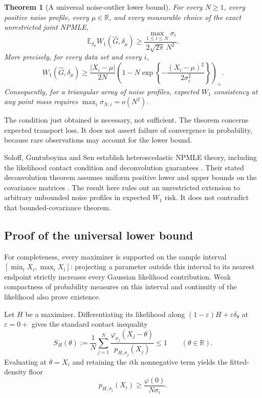 \documentclass[11pt,a4paper]{article}
\newtheorem{theorem}{Theorem}[section]
\theoremstyle{definition}
\theoremstyle{remark}
\numberwithin{equation}{section}
\begin{document}
\begin{theorem}[A universal noise-outlier lower bound]\label{p7:ho:main}
For every $N\ge1$, every positive noise profile, every $\mu\in\mathbb R$,
and every measurable choice of the exact unrestricted joint NPMLE,
\begin{equation}\label{p7:ho:risk}
 \mathbb E_{\delta_\mu} W_1(\widehat G,\delta_\mu)
       \ge \frac{\max_{1\le i\le N}\sigma_i}
                       {2\sqrt{2\pi}\,N^2}.
\end{equation}
More precisely, for every data set and every $i$,
\begin{equation}\label{p7:ho:deterministic}
 W_1(\widehat G,\delta_\mu)
 \ge \frac{|X_i-\mu|}{2N}
       \left(1-N\exp\left\{-\frac{(X_i-\mu)^2}{2\sigma_i^2}\right\}
       \right)_+.
\end{equation}
Consequently, for a triangular array of noise profiles, expected
$W_1$ consistency at any point mass requires
$\max_i\sigma_{N,i}=o(N^2)$.
\end{theorem}

The condition just obtained is necessary, not sufficient.  The theorem
concerns expected transport loss.  It does not assert failure of
convergence in probability, because rare observations may account for
the lower bound.

Soloff, Guntuboyina and Sen establish heteroscedastic NPMLE theory,
including the likelihood contact condition and deconvolution guarantees
\cite{p7:HO_SGS}.  Their stated deconvolution theorem assumes uniform
positive lower and upper bounds on the covariance matrices
\cite[Theorem 11]{p7:HO_SGSpreprint}.  The result here rules out an
unrestricted extension to arbitrary unbounded noise profiles in expected
$W_1$ risk.  It does not contradict that bounded-covariance theorem.

\subsection{Proof of the universal lower bound}

For completeness, every maximizer is supported on the sample interval
$[\min_iX_i,\max_iX_i]$: projecting a parameter outside this interval
to its nearest endpoint strictly increases every Gaussian likelihood
contribution.  Weak compactness of probability measures on this
interval and continuity of the likelihood also prove existence.

Let $H$ be a maximizer.  Differentiating its likelihood along
$(1-\varepsilon)H+\varepsilon\delta_\theta$ at $\varepsilon=0+$
gives the standard contact inequality
\[
 S_H(\theta):=\frac1N\sum_{j=1}^N
  \frac{\varphi_{\sigma_j}(X_j-\theta)}{p_{H,\sigma_j}(X_j)}
       \le1 \qquad(\theta\in\mathbb R).
\]
Evaluating at $\theta=X_i$ and retaining the $i$th nonnegative term
yields the fitted-density floor
\begin{equation}\label{p7:ho:floor}
       p_{H,\sigma_i}(X_i)\ge\frac{\varphi(0)}{N\sigma_i}.
\end{equation}
\end{document}
